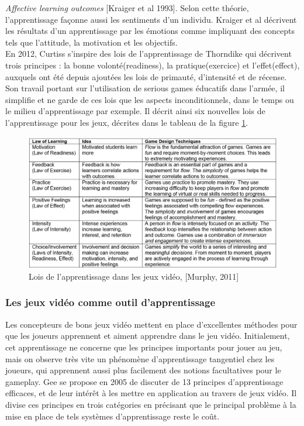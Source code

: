 \emph{Affective learning outcomes} [Kraiger et al 1993]. Selon cette théorie, l'apprentissage façonne aussi les sentiments d'un individu. Kraiger et al décrivent les résultats d'un apprentissage par les émotions comme impliquant des concepts tels que l'attitude, la motivation et les objectifs.\\

En 2012, Curtiss s'inspire des lois de l'apprentissage de Thorndike qui décrivent trois principes : la bonne volonté(readiness), la pratique(exercice) et l'effet(effect), auxquels ont été depuis ajoutées les lois de primauté, d'intensité et de récense. Son travail portant sur l'utilisation de serious games éducatifs dans l'armée, il simplifie et ne garde de ces lois que les aspects inconditionnels, dans le temps ou le milieu d'apprentissage par exemple. Il décrit ainsi six nouvelles lois de l'apprentissage pour les jeux, décrites dans le tableau de la figure \ref{laws_of_learning_for_games}.

\begin{figure}[h!]
	\includegraphics[width=1.1\linewidth]{images/laws_of_learning_for_games.png}
	\caption{Lois de l'apprentissage dans les jeux vidéo, [Murphy, 2011]\cite{Murp11}}
	\label{laws_of_learning_for_games}
\end{figure}

		\subsubsection*{Les jeux vidéo comme outil d'apprentissage}
Les concepteurs de bons jeux vidéo mettent en place d'excellentes méthodes pour que les joueurs apprennent et aiment apprendre dans le jeu vidéo. Initialement, cet apprentissage ne concerne que les principes importants pour jouer au jeu, mais on observe très vite un phénomène d'apprentissage tangentiel chez les joueurs, qui apprennent aussi plus facilement des notions facultatives pour le gameplay. Gee se propose en 2005 de discuter de 13 principes d'apprentissage efficaces, et de leur intérêt à les mettre en application au travers de jeux vidéo. Il divise ces principes en trois catégories en précisant que le principal problème à la mise en place de tels systèmes d'apprentissage reste le coût.
